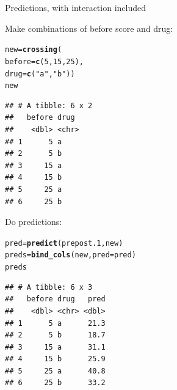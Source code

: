 \documentclass[unknownkeysallowed]{beamer}\usepackage[]{graphicx}\usepackage[]{color}
\makeatletter
\newcommand{\hlnum}[1]{\textcolor[rgb]{0.686,0.059,0.569}{#1}}%
\newcommand{\hlstr}[1]{\textcolor[rgb]{0.192,0.494,0.8}{#1}}%
\newcommand{\hlstd}[1]{\textcolor[rgb]{0.345,0.345,0.345}{#1}}%
\newcommand{\hlkwb}[1]{\textcolor[rgb]{0.69,0.353,0.396}{#1}}%
\newcommand{\hlkwc}[1]{\textcolor[rgb]{0.333,0.667,0.333}{#1}}%
\newcommand{\hlkwd}[1]{\textcolor[rgb]{0.737,0.353,0.396}{\textbf{#1}}}%
\newenvironment{kframe}{%
 \def\at@end@of@kframe{}%
 \ifinner\ifhmode%
  \def\at@end@of@kframe{\end{minipage}}%
  \begin{minipage}{\columnwidth}%
 \fi\fi%
 \def\FrameCommand##1{\hskip\@totalleftmargin \hskip-\fboxsep
 \colorbox{shadecolor}{##1}\hskip-\fboxsep
     \hskip-\linewidth \hskip-\@totalleftmargin \hskip\columnwidth}%
 \MakeFramed {\advance\hsize-\width
   \@totalleftmargin\z@ \linewidth\hsize
   \@setminipage}}%
 {\par\unskip\endMakeFramed%
 \at@end@of@kframe}
\newenvironment{knitrout}{}{} %
\makeatother
\begin{document}
\begin{frame}[fragile]{Predictions, with interaction included}


  
  \begin{multicols}{2}
    

  
  Make combinations of before score and drug:
  
\begin{knitrout}
\color{fgcolor}\begin{kframe}
\begin{alltt}
\hlstd{new}\hlkwb{=}\hlkwd{crossing}\hlstd{(}
      \hlkwc{before}\hlstd{=}\hlkwd{c}\hlstd{(}\hlnum{5}\hlstd{,}\hlnum{15}\hlstd{,}\hlnum{25}\hlstd{),}
      \hlkwc{drug}\hlstd{=}\hlkwd{c}\hlstd{(}\hlstr{"a"}\hlstd{,}\hlstr{"b"}\hlstd{))}
\hlstd{new}
\end{alltt}
\begin{verbatim}
## # A tibble: 6 x 2
##   before drug 
##    <dbl> <chr>
## 1      5 a    
## 2      5 b    
## 3     15 a    
## 4     15 b    
## 5     25 a    
## 6     25 b
\end{verbatim}
\end{kframe}
\end{knitrout}

Do predictions:

\begin{knitrout}\small
{}\color{fgcolor}\begin{kframe}
\begin{alltt}
\hlstd{pred}\hlkwb{=}\hlkwd{predict}\hlstd{(prepost.1,new)}
\hlstd{preds}\hlkwb{=}\hlkwd{bind_cols}\hlstd{(new,}\hlkwc{pred}\hlstd{=pred)}
\hlstd{preds}
\end{alltt}
\begin{verbatim}
## # A tibble: 6 x 3
##   before drug   pred
##    <dbl> <chr> <dbl>
## 1      5 a      21.3
## 2      5 b      18.7
## 3     15 a      31.1
## 4     15 b      25.9
## 5     25 a      40.8
## 6     25 b      33.2
\end{verbatim}
\end{kframe}
\end{knitrout}
  
  \end{multicols}

\end{frame}
\end{document}
